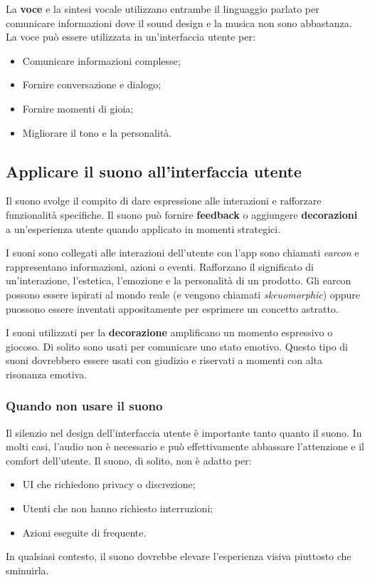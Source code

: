 \documentclass[12pt, a4paper]{report}
\begin{document}
        La \textbf{voce} e la sintesi vocale utilizzano entrambe il linguaggio parlato per comunicare informazioni dove il sound
        design e la musica non sono abbastanza. La voce può essere utilizzata in un'interfaccia utente per:
        \begin{itemize}
    		\item Comunicare informazioni complesse;
       		\item Fornire conversazione e dialogo;
       		\item Fornire momenti di gioia;
       		\item Migliorare il tono e la personalità.
        \end{itemize}


              \subsection{Applicare il suono all'interfaccia utente}
              	Il suono svolge il compito di dare espressione alle interazioni e rafforzare funzionalità specifiche.
               	Il suono può fornire \textbf{feedback} o aggiungere \textbf{decorazioni} a un'esperienza utente quando applicato in momenti strategici.


               	I suoni sono collegati alle interazioni dell’utente con l’app sono chiamati \textit{earcon} e rappresentano informazioni, azioni o eventi. Rafforzano il significato di un'interazione,
               	l'estetica, l'emozione e la personalità di un prodotto. Gli earcon possono essere ispirati al mondo reale (e vengono chiamati \textit{skeuomorphic}) oppure puossono essere inventati
               	appositamente per esprimere un concetto astratto.


               	I suoni utilizzati per la \textbf{decorazione} amplificano un momento espressivo o giocoso. Di solito sono usati per comunicare
               	uno stato emotivo. Questo tipo di suoni dovrebbero essere usati con giudizio e riservati a momenti con alta risonanza emotiva.


               	\subsubsection{Quando non usare il suono}
                	Il silenzio nel design dell'interfaccia utente è importante tanto quanto il suono. In molti casi, l’audio non è necessario e può
                	effettivamente abbassare l'attenzione e il comfort dell'utente. Il suono, di solito, non è adatto per:
                	\begin{itemize}
                		\item UI che richiedono privacy o discrezione;
                		\item Utenti che non hanno richiesto interruzioni;
                		\item Azioni eseguite di frequente.
                	\end{itemize}
                	In qualsiasi contesto, il suono dovrebbe elevare l'esperienza visiva piuttosto che sminuirla.
\end{document}

